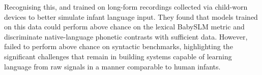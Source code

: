 Recognising this, \citet{lavechin} and \citet{lavechin2024modeling} trained \stela on long-form recordings collected via child-worn devices to better simulate infant language input. They found that models trained on this data could perform above chance on the lexical BabySLM metric and discriminate native-language phonetic contrasts with sufficient data. However, \stela failed to perform above chance on syntactic benchmarks, highlighting the significant challenges that remain in building systems capable of learning language from raw signals in a manner comparable to human infants.


